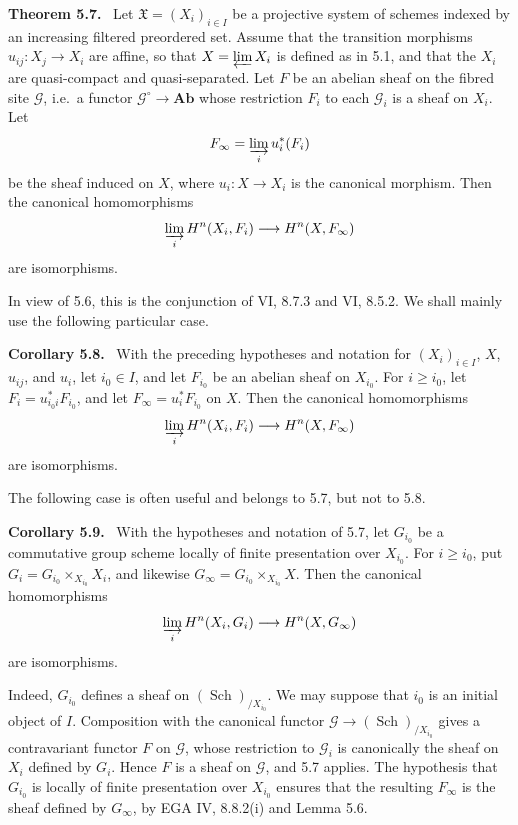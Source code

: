 \documentclass[11pt]{article}
\newcommand{\Gg}{\mathcal{G}}
\newcommand{\Sch}{\operatorname{Sch}}
\newcommand{\Ab}{\mathbf{Ab}}
\newcommand{\ie}{i.e.\ }
\newcommand{\EGA}{EGA}
\newenvironment{statement}[1]{\par\medskip\noindent\textbf{#1.}\ }{\par\medskip}
\begin{document}
\begin{statement}{Theorem 5.7}
Let \(\mathfrak X=(X_i)_{i\in I}\) be a projective system of schemes indexed by an increasing filtered preordered set. Assume that the transition morphisms \(u_{ij}:X_j\to X_i\) are affine, so that \(X=\varprojlim X_i\) is defined as in 5.1, and that the \(X_i\) are quasi-compact and quasi-separated. Let \(F\) be an abelian sheaf on the fibred site \(\Gg\), \ie a functor \(\Gg^\circ\to\Ab\) whose restriction \(F_i\) to each \(\Gg_i\) is a sheaf on \(X_i\). Let
\[
F_\infty=\varinjlim_i u_i^*(F_i)
\]
be the sheaf induced on \(X\), where \(u_i:X\to X_i\) is the canonical morphism. Then the canonical homomorphisms
\[
\varinjlim_i H^n(X_i,F_i)\longrightarrow H^n(X,F_\infty)
\]
are isomorphisms.
\end{statement}

In view of 5.6, this is the conjunction of VI, 8.7.3 and VI, 8.5.2. We shall mainly use the following particular case.

\begin{statement}{Corollary 5.8}
With the preceding hypotheses and notation for \((X_i)_{i\in I}\), \(X\), \(u_{ij}\), and \(u_i\), let \(i_0\in I\), and let \(F_{i_0}\) be an abelian sheaf on \(X_{i_0}\). For \(i\ge i_0\), let \(F_i=u_{i_0i}^*F_{i_0}\), and let \(F_\infty=u_i^*F_{i_0}\) on \(X\). Then the canonical homomorphisms
\[
\varinjlim_i H^n(X_i,F_i)\longrightarrow H^n(X,F_\infty)
\]
are isomorphisms.
\end{statement}

The following case is often useful and belongs to 5.7, but not to 5.8.

\begin{statement}{Corollary 5.9}
With the hypotheses and notation of 5.7, let \(G_{i_0}\) be a commutative group scheme locally of finite presentation over \(X_{i_0}\). For \(i\ge i_0\), put \(G_i=G_{i_0}\times_{X_{i_0}}X_i\), and likewise \(G_\infty=G_{i_0}\times_{X_{i_0}}X\). Then the canonical homomorphisms
\[
\varinjlim_i H^n(X_i,G_i)\longrightarrow H^n(X,G_\infty)
\]
are isomorphisms.
\end{statement}

Indeed, \(G_{i_0}\) defines a sheaf on \((\Sch)_{/X_{i_0}}\). We may suppose that \(i_0\) is an initial object of \(I\). Composition with the canonical functor \(\Gg\to(\Sch)_{/X_{i_0}}\) gives a contravariant functor \(F\) on \(\Gg\), whose restriction to \(\Gg_i\) is canonically the sheaf on \(X_i\) defined by \(G_i\). Hence \(F\) is a sheaf on \(\Gg\), and 5.7 applies. The hypothesis that \(G_{i_0}\) is locally of finite presentation over \(X_{i_0}\) ensures that the resulting \(F_\infty\) is the sheaf defined by \(G_\infty\), by \EGA{} IV, 8.8.2(i) and Lemma 5.6.
\end{document}
